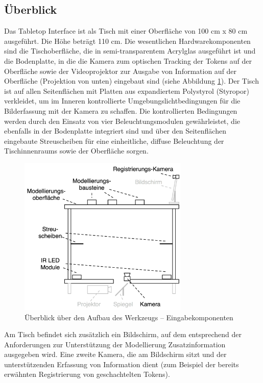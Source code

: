 \subsection{Überblick} %
\label{sub:Überblick}

Das Tabletop Interface ist als Tisch mit einer Oberfläche von 100 cm x 80 cm ausgeführt. Die Höhe beträgt 110 cm. Die wesentlichen Hardwarekomponenten sind die Tischoberfläche, die in semi-transparentem Acrylglas ausgeführt ist und die Bodenplatte, in die die Kamera zum optischen Tracking der Tokens auf der Oberfläche sowie der Videoprojektor zur Ausgabe von Information auf der Oberfläche (Projektion von unten) eingebaut sind (siehe Abbildung \ref{fig:img_ImplementierungInput_TischSeitenansicht}). Der Tisch ist auf allen Seitenflächen mit Platten aus expandiertem Polystyrol (Styropor) verkleidet, um im Inneren kontrollierte Umgebungslichtbedingungen für die Bilderfassung mit der Kamera zu schaffen. Die kontrollierten Bedingungen werden durch den Einsatz von vier Beleuchtungsmodulen gewährleistet, die ebenfalls in der Bodenplatte integriert sind und über den Seitenflächen eingebaute Streuscheiben für eine einheitliche, diffuse Beleuchtung der Tischinnenraums sowie der Oberfläche sorgen.

\begin{figure}[htbp]
	\centering
		\includegraphics[height=3in]{img/ImplementierungInput/TischSeitenansichtInput.png}
	\caption{Überblick über den Aufbau des Werkzeugs -- Eingabekomponenten}
	\label{fig:img_ImplementierungInput_TischSeitenansicht}
\end{figure}

Am Tisch befindet sich zusätzlich ein Bildschirm, auf dem entsprechend der Anforderungen zur Unterstützung der Modellierung Zusatzinformation ausgegeben wird. Eine zweite Kamera, die am Bildschirm sitzt und der unterstützenden Erfassung von Information dient (zum Beispiel der bereits erwähnten Registrierung von geschachtelten Tokens).

